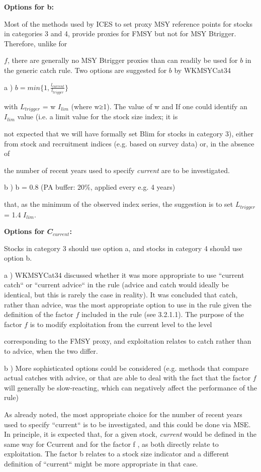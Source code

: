 \documentclass[11pt]{article}
\begin{document}
\textbf{Options for b:} 

Most of the methods used by ICES to set proxy MSY reference points for stocks in categories 3 and 4, provide proxies for FMSY but not for MSY Btrigger. Therefore, unlike for 

$f$, there are generally no MSY Btrigger proxies than can readily be used for $b$ in the generic catch rule. Two options are suggested for $b$ by WKMSYCat34 

a ) $b= min\lbrace{ 1,\frac{l_{current}}{l_{trigger}}\rbrace}$

with $L_{trigger}$ = w $I_{lim}$ (where w≥1). The value of w and If one could identify an $I_{lim}$ value (i.e. a limit value for the stock size index; it is 

not expected that we will have formally set Blim for stocks in category 3), either from stock and recruitment indices (e.g. based on survey data) or, in the absence of 

the number of recent years used to specify \textit{current} are to be investigated. 

 
b )  b = 0.8 (PA buffer: 20\%, applied every e.g. 4 years) 

that, as the minimum of the observed index series, the suggestion is to set $L_{trigger}$ = 1.4 $I_{lim}$. 

\textbf{Options for $𝑪_{current}$:}

Stocks in category 3 should use option a, and stocks in category 4 should use option b. 

a )  WKMSYCat34 discussed whether it was more appropriate to use “current catch“ or “current advice“ in the rule (advice and catch would ideally be identical, but this is rarely the case in reality). It was concluded that catch, rather than advice, was the most appropriate option to use in the rule given the definition of the factor $f$ included in the rule (see 3.2.1.1). The purpose of the factor $f$ is to modify exploitation from the current level to the level 

corresponding to the FMSY proxy, and exploitation relates to catch rather than to advice, when the two differ. 

b )  More sophisticated options could be considered (e.g. methods that compare actual catches with advice, or that are able to deal with the fact that the factor $f$ will  generally  be  slow-reacting,  which  can  negatively  affect  the  performance of the rule) 

As already noted, the most appropriate choice for the number of recent years used to specify “current“ is to be investigated, and this could be done via MSE. In principle, it is expected that, for a given stock, \textit{current} would be defined in the same way for Ccurrent and for the factor f , as both directly relate to exploitation. The factor b relates to a stock size indicator and a different definition of “current“ might be more appropriate in that case.  
\end{document}
